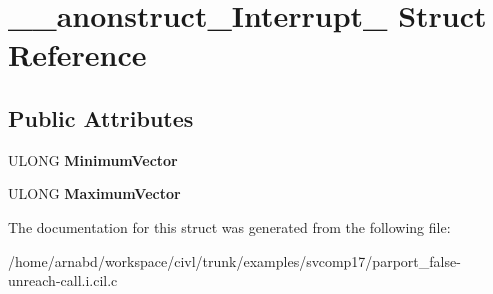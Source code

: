 \hypertarget{struct____anonstruct__Interrupt__27}{}\section{\+\_\+\+\_\+anonstruct\+\_\+\+Interrupt\+\_ Struct Reference}
\label{struct____anonstruct__Interrupt__27}
\subsection*{Public Attributes}
\begin{DoxyCompactItemize}
\item 
\hypertarget{struct____anonstruct__Interrupt__27_ae4207e086f9f63650555375ab114a8da}{}U\+L\+O\+N\+G {\bfseries Minimum\+Vector}\label{struct____anonstruct__Interrupt__27_ae4207e086f9f63650555375ab114a8da}

\item 
\hypertarget{struct____anonstruct__Interrupt__27_a0f2a18f11a757c5fe68741011f73dc9e}{}U\+L\+O\+N\+G {\bfseries Maximum\+Vector}\label{struct____anonstruct__Interrupt__27_a0f2a18f11a757c5fe68741011f73dc9e}

\end{DoxyCompactItemize}


The documentation for this struct was generated from the following file\+:\begin{DoxyCompactItemize}
\item 
/home/arnabd/workspace/civl/trunk/examples/svcomp17/parport\+\_\+false-\/unreach-\/call.\+i.\+cil.\+c\end{DoxyCompactItemize}
